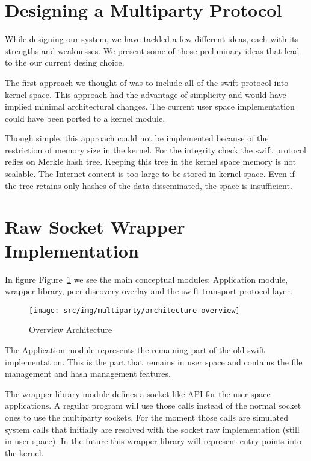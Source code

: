 \section{Designing a Multiparty Protocol}
\label{sec:multiparty:design}

While designing our system, we have tackled a few different ideas, each with
its strengths and weaknesses. We present some of those preliminary ideas
that lead to the our current desing choice.

The first approach we thought of was to include all of the swift protocol into
kernel space. This approach had the advantage of simplicity and would have
implied minimal architectural changes. The current user space implementation
could have been ported to a kernel module.

Though simple, this approach could not be implemented because of the
restriction of memory size in the kernel.  For the integrity check the swift
protocol relies on Merkle hash tree. Keeping this tree in the kernel space
memory is not scalable. The Internet content is too large to be stored in
kernel space. Even if the tree retains only hashes of the data disseminated, the
space is insufficient.

\section{Raw Socket Wrapper Implementation}
\label{sec:multiparty:raw-socket}

In figure Figure~\ref{fig:multiparty:architecture-overview} we see the main
conceptual modules: Application module, wrapper library, peer discovery
overlay and the swift transport protocol layer.

\begin{figure}
  \centering
  \texttt{[image: src/img/multiparty/architecture-overview]}
  \caption{Overview Architecture}
  \label{fig:multiparty:architecture-overview}
\end{figure}

The Application module represents the remaining part of the old swift
implementation. This is the part that remains in user space and contains the
file management and hash management features. 

The wrapper library module defines a socket-like API for the user space
applications. A regular program will use those calls instead of the normal
socket ones to use the multiparty sockets. For the moment those calls are
simulated system calls that initially are resolved with the socket raw
implementation (still in user space). In the future this wrapper library
will represent entry points into the kernel.

